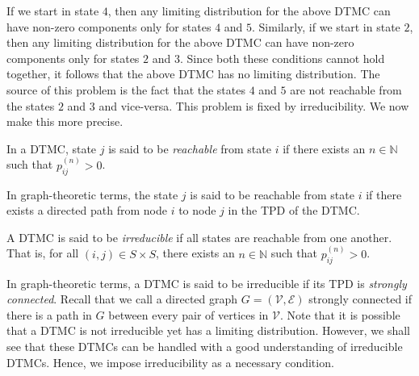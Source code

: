 \documentclass[12pt]{article}
\theoremstyle{definition}
\begin{document}
\begin{center}
\end{center}

If we start in state $4$, then any limiting distribution for the above DTMC can have non-zero components only for states $4$ and $5$. Similarly, if we start in state $2$, then any limiting distribution for the above DTMC can have non-zero components only for states $2$ and $3$. Since both these conditions cannot hold together, it follows that the above DTMC has no limiting distribution. The source of this problem is the fact that the states $4$ and $5$ are not reachable from the states $2$ and $3$ and vice-versa. This problem is fixed by irreducibility. We now make this more precise.

\begin{defn}[Reachability]
    In a DTMC, state $j$ is said to be \emph{reachable} from state $i$ if there exists an $n \in \mathbb{N}$ such that $p_{ij}^{(n)} > 0$.
\end{defn}
In graph-theoretic terms, the state $j$ is said to be reachable from state $i$ if there exists a directed path from node $i$ to node $j$ in the TPD of the DTMC.

\begin{defn}[Irreducibility]
    A DTMC is said to be \emph{irreducible} if all states are reachable from one another. That is, for all $(i,j) \in S \times S$, there exists an $n \in \mathbb{N}$ such that $p_{ij}^{(n)} > 0$.
\end{defn}

In graph-theoretic terms, a DTMC is said to be irreducible if its TPD is \emph{strongly connected}. Recall that we call a directed graph $G = (\mathcal{V}, \mathcal{E})$ strongly connected if there is a path in $G$ between every pair of vertices in $\mathcal{V}$. Note that it is possible that a DTMC is not irreducible yet has a limiting distribution. However, we shall see that these DTMCs can be handled with a good understanding of irreducible DTMCs. Hence, we impose irreducibility as a necessary condition.
\end{document}
